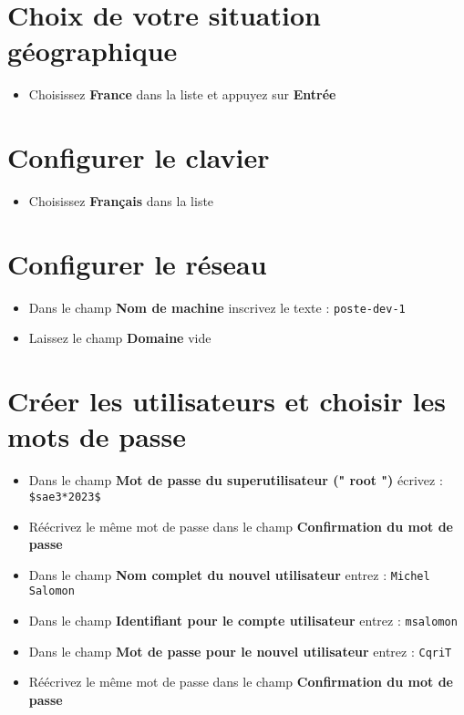 \section{Choix de votre situation géographique}
\begin{itemize}
	\item Choisissez \textbf{France} dans la liste et appuyez sur \textbf{Entrée}
\end{itemize}

\section{Configurer le clavier}
\begin{itemize}
	\item Choisissez \textbf{Français} dans la liste
\end{itemize}

\section{Configurer le réseau}

\begin{itemize}
	\item Dans le champ \textbf{Nom de machine} inscrivez le texte : \texttt{poste-dev-1}
	\item Laissez le champ \textbf{Domaine} vide
\end{itemize}

\section{Créer les utilisateurs et choisir les mots de passe}
\begin{itemize}
	\item Dans le champ \textbf{Mot de passe du superutilisateur (" root ")} écrivez : \texttt{\$sae3*2023\$}
	\item Réécrivez le même mot de passe dans le champ \textbf{Confirmation du mot de passe}
	\item Dans le champ \textbf{Nom complet du nouvel utilisateur} entrez : \texttt{Michel Salomon}
	\item Dans le champ \textbf{Identifiant pour le compte utilisateur} entrez : \texttt{msalomon}
	\item Dans le champ \textbf{Mot de passe pour le nouvel utilisateur} entrez : \texttt{CqriT}
	\item Réécrivez le même mot de passe dans le champ \textbf{Confirmation du mot de passe}
\end{itemize}

